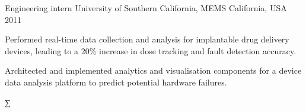 \begin{cventries}





\cventry
{Engineering intern}
{University of Southern California, MEMS}
{California, USA}
{2011}
{
\begin{cvitems}
\item {Performed real-time data collection and analysis for implantable drug delivery devices, leading to a 20\% increase in dose tracking and fault detection accuracy.}
\item {Architected and implemented analytics and visualisation components for a device data analysis platform to predict potential hardware failures.}
\end{cvitems}
}


\end{cventries}∑